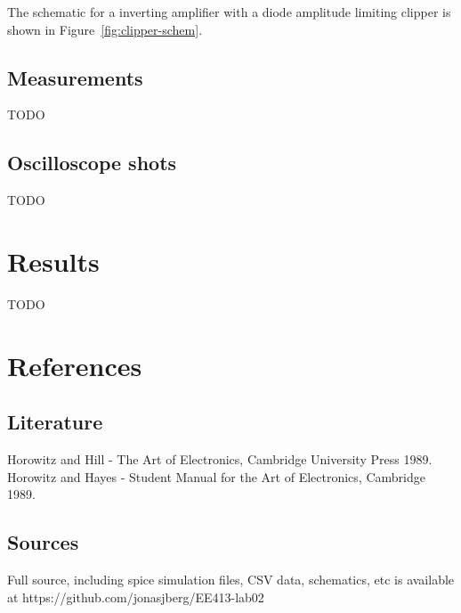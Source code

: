 \documentclass[11pt,a4paper]{article}
\begin{document}
The schematic for a inverting amplifier with a diode amplitude limiting clipper
is shown in Figure~\ref{fig:clipper-schem}.

\subsection{Measurements}\label{clipper-measurements}
TODO

\subsection{Oscilloscope shots}\label{clipper-oscilloscope-shots}
TODO


\section{Results}\label{setup}
TODO

\newpage

\section{References}\label{references}

\subsection{Literature}\label{literature}
Horowitz and Hill - The Art of Electronics, Cambridge University Press
1989. Horowitz and Hayes - Student Manual for the Art of Electronics,
Cambridge 1989.

\subsection{Sources}\label{sources}
Full source, including spice simulation files, CSV data, schematics, etc
is available at https://github.com/jonasjberg/EE413-lab02


\end{document}
